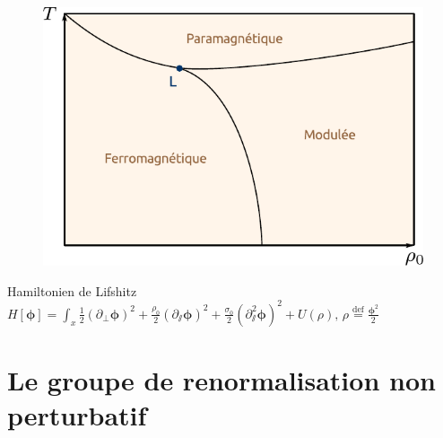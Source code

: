 \documentclass[xcolor=dvipsnames]{beamer}
\newcommand{\p}[1]{\partial_{#1}}
\newcommand{\define}{\ensuremath{ \overset{\text{def}}{=} }}
\begin{document}
\begin{frame}

\begin{figure}[htp]
\centering
\includegraphics[scale=0.65]{img/phase_diagram.pdf}
\label{}
\end{figure}

\begin{block}{Hamiltonien de Lifshitz}
\centering
$ H[\boldsymbol{\phi}] = \int_x  \frac{1}{2}(\p{\perp} \boldsymbol{\phi})^2 + \frac{\rho_0}{2}(\p{\sslash} \boldsymbol{\phi})^2 + \frac{\sigma_0}{2} (\p{\sslash}^2 \boldsymbol{\phi})^2 + U(\rho) \text{,~} \rho \define \frac{\boldsymbol{\phi}^2}{2}$
\end{block}

\end{frame}

\section{Le groupe de renormalisation non perturbatif}
\end{document}
